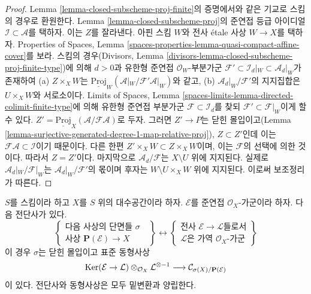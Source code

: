 \begin{proof}
Lemma \ref{lemma-closed-subscheme-proj-finite}의 증명에서와 같은 기교로
스킴의 경우로 환원한다. Lemma \ref{lemma-closed-subscheme-proj}의
준연접 등급 아이디얼 $\mathcal{I} \subset \mathcal{A}$를 택하자.
이는 $Z$를 잘라낸다. 아핀 스킴 $W$와 전사
\'etale 사상 $W \to X$를 택하자. Properties of Spaces, Lemma
\ref{spaces-properties-lemma-quasi-compact-affine-cover}를 보라.
스킴의 경우(Divisors, Lemma
\ref{divisors-lemma-closed-subscheme-proj-finite-type})에 의해
$d > 0$과 유한형 준연접 $\mathcal{O}_W$-부분가군
$\mathcal{F}' \subset \mathcal{I}_d|_W \subset \mathcal{A}_d|_W$가
존재하여 (a) $Z \times_X W$는
$\underline{\text{Proj}}_W(\mathcal{A}|_W/\mathcal{F}'\mathcal{A}|_W)$와
같고, (b) $\mathcal{A}_d|_W/\mathcal{F}'$의 지지집합은
$U \times_X W$와 서로소이다. Limits of Spaces, Lemma
\ref{spaces-limits-lemma-directed-colimit-finite-type}에 의해
유한형 준연접 부분가군 $\mathcal{F} \subset \mathcal{I}_d$를 찾되
$\mathcal{F}' \subset \mathcal{F}|_W$이게 할 수 있다.
$Z' = \underline{\text{Proj}}_X(\mathcal{A}/\mathcal{F}\mathcal{A})$로
두자. 그러면
$Z' \to P$는 닫힌 몰입이고(Lemma
\ref{lemma-surjective-generated-degree-1-map-relative-proj}),
$Z \subset Z'$인데 이는 $\mathcal{F}\mathcal{A} \subset \mathcal{I}$이기
때문이다. 다른 한편 $Z' \times_X W \subset Z \times_X W$이며, 이는
$\mathcal{F}$의 선택에 의한 것이다. 따라서 $Z = Z'$이다.
마지막으로 $\mathcal{A}_d/\mathcal{F}$는 $X \setminus U$ 위에
지지된다. 실제로 $\mathcal{A}_d|_W/\mathcal{F}|_W$는
$\mathcal{A}_d|_W/\mathcal{F}'$의 몫이며 후자는
$W \setminus U \times_X W$ 위에 지지된다. 이로써 보조정리가 따른다.
\end{proof}

\begin{lemma}
\label{lemma-conormal-sheaf-section-projective-bundle}
$S$를 스킴이라 하고 $X$를 $S$ 위의 대수공간이라 하자.
$\mathcal{E}$를 준연접 $\mathcal{O}_X$-가군이라 하자. 다음 전단사가
있다.
$$
\left\{
\begin{matrix}
\text{다음 사상의 단면들 }\sigma\text{ } \\
\text{사상 }\mathbf{P}(\mathcal{E}) \to X
\end{matrix}
\right\}
\leftrightarrow
\left\{
\begin{matrix}
\text{전사 }\mathcal{E} \to \mathcal{L}\text{들로서} \\
\mathcal{L}\text{은 가역 }\mathcal{O}_X\text{-가군}
\end{matrix}
\right\}
$$
이 경우 $\sigma$는 닫힌 몰입이고 표준 동형사상
$$
\mathop{\mathrm{Ker}}(\mathcal{E} \to \mathcal{L})
\otimes_{\mathcal{O}_X} \mathcal{L}^{\otimes -1}
\longrightarrow
\mathcal{C}_{\sigma(X)/\mathbf{P}(\mathcal{E})}
$$
이 있다. 전단사와 동형사상은 모두 밑변환과 양립한다.
\end{lemma}

